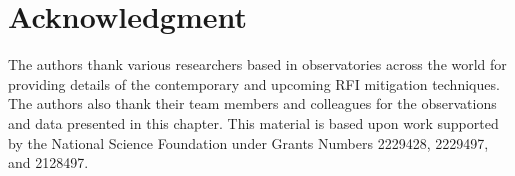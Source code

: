 \section{Acknowledgment}
\label{section:hardware:acknowledgment}
The authors thank various researchers based in observatories across the world for providing details of the contemporary and upcoming RFI mitigation techniques. The authors also thank their team members and colleagues for the observations and data presented in this chapter.
This material is based upon work supported by the National Science Foundation under Grants Numbers 2229428, 2229497, and 2128497.